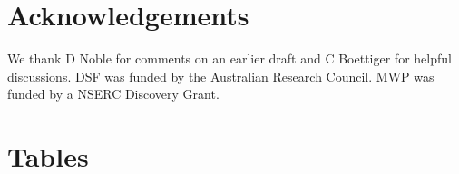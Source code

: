 \documentclass[a4paper,11pt]{article}
\begin{document}



\section{Acknowledgements}
We thank D Noble for comments on an earlier draft and C Boettiger for helpful discussions. DSF was funded by the Australian Research Council. MWP was funded by a NSERC Discovery Grant.

\newpage

\section{Tables}
\end{document}
